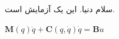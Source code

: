 \documentclass[12pt,a4paper]{article}
\begin{document}
\noindent سلام دنيا. اين يک آزمايش است.

\noindent $\mathbf{M}(q)\ddot{q} + \mathbf{C}(q,\dot{q})\dot{q} = \mathbf{B}u$
\end{document}
